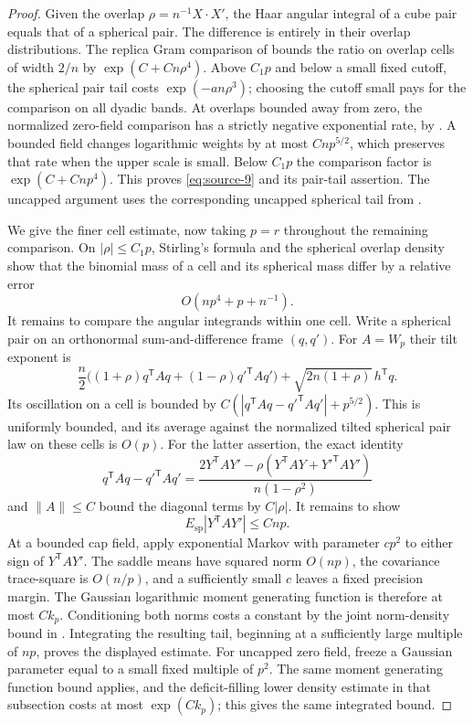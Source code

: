\begin{proof}
Given the overlap $\rho=n^{-1}X\cdot X'$, the Haar angular integral of a
cube pair equals that of a spherical pair. The difference is entirely in
their overlap distributions. The replica Gram comparison of
\cite[Section~15.4, Equation~(15.10)]{CM} bounds the ratio on overlap cells
of width $2/n$ by $\exp(C+Cn\rho^4)$. Above $C_1p$ and below a small fixed
cutoff, the spherical pair tail costs $\exp(-a n\rho^3)$; choosing the
cutoff small pays for the comparison on all dyadic bands. At overlaps
bounded away from zero, the normalized zero-field comparison has a strictly
negative exponential rate, by
\cite[Section~15.4, p.~118]{CM}. A bounded
field changes logarithmic weights by at most $Cnp^{5/2}$, which preserves
that rate when the upper scale is small. Below $C_1p$ the comparison factor
is $\exp(C+Cnp^4)$. This proves \eqref{eq:source-9} and its pair-tail
assertion. The uncapped argument uses the corresponding uncapped spherical
tail from \cite[Section~15.3]{CM}.

We give the finer cell estimate, now taking $p=r$ throughout the remaining
comparison. On $|\rho|\le C_1p$, Stirling's formula and the spherical
overlap density show that the binomial mass of a cell and its spherical
mass differ by a relative error
\[
 O(np^4+p+n^{-1}).
\]
It remains to compare the angular integrands within one cell. Write a
spherical pair on an orthonormal sum-and-difference frame $(q,q')$. For
$A=W_p$ their tilt exponent is
\[
 \frac n2\bigl((1+\rho)q^{\mathsf T}Aq
 +(1-\rho){q'}^{\mathsf T}Aq'\bigr)
 +\sqrt{2n(1+\rho)}\,h^{\mathsf T}q.
\]
Its oscillation on a cell is bounded by
$C(|q^{\mathsf T}Aq-{q'}^{\mathsf T}Aq'|+p^{5/2})$.
This is uniformly bounded, and its average against the normalized tilted
spherical pair law on these cells is $O(p)$. For the latter assertion,
the exact identity
\[
 q^{\mathsf T}Aq-{q'}^{\mathsf T}Aq'
 =\frac{2Y^{\mathsf T}AY'
       -\rho(Y^{\mathsf T}AY+{Y'}^{\mathsf T}AY')}
       {n(1-\rho^2)}
\]
and $\|A\|\le C$ bound the diagonal terms by $C|\rho|$. It remains to show
\[
 E_{\mathrm{sp}}|Y^{\mathsf T}AY'|\le Cnp.
\]
At a bounded cap field, apply exponential Markov with parameter $cp^2$
to either sign of $Y^{\mathsf T}AY'$. The saddle means have squared norm
$O(np)$, the covariance trace-square is $O(n/p)$, and a sufficiently small
$c$ leaves a fixed precision margin. The Gaussian logarithmic moment
generating function is therefore at most $Ck_p$. Conditioning both norms
costs a constant by the joint norm-density bound in
\cite[Equation~(15.6)]{CM}. Integrating
the resulting tail, beginning at a sufficiently large multiple of $np$,
proves the displayed estimate. For uncapped zero field, freeze a Gaussian
parameter equal to a small fixed multiple of $p^2$. The same moment
generating function bound applies, and the deficit-filling lower density
estimate in that subsection costs at most $\exp(Ck_p)$; this gives the
same integrated bound.


\end{proof}

